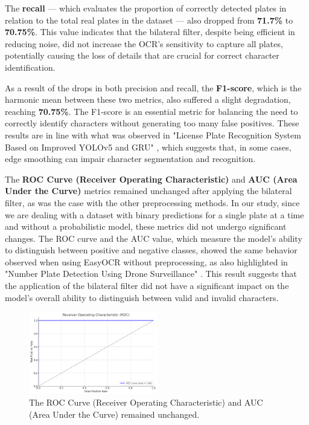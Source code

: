 \documentclass[conference]{IEEEtran}
\begin{document}
	The \textbf{recall} — which evaluates the proportion of correctly detected plates in relation to the total real plates in the dataset — also dropped from \textbf{71.7\%} to \textbf{70.75\%}. This value indicates that the bilateral filter, despite being efficient in reducing noise, did not increase the OCR's sensitivity to capture all plates, potentially causing the loss of details that are crucial for correct character identification.
	
	As a result of the drops in both precision and recall, the \textbf{F1-score}, which is the harmonic mean between these two metrics, also suffered a slight degradation, reaching \textbf{70.75\%}. The F1-score is an essential metric for balancing the need to correctly identify characters without generating too many false positives. These results are in line with what was observed in "License Plate Recognition System Based on Improved YOLOv5 and GRU" \cite{b8}, which suggests that, in some cases, edge smoothing can impair character segmentation and recognition.
	
	The \textbf{ROC Curve (Receiver Operating Characteristic)} and \textbf{AUC (Area Under the Curve)} metrics remained unchanged after applying the bilateral filter, as was the case with the other preprocessing methods. In our study, since we are dealing with a dataset with binary predictions for a single plate at a time and without a probabilistic model, these metrics did not undergo significant changes. The ROC curve and the AUC value, which measure the model's ability to distinguish between positive and negative classes, showed the same behavior observed when using EasyOCR without preprocessing, as also highlighted in "Number Plate Detection Using Drone Surveillance" \cite{b15}. This result suggests that the application of the bilateral filter did not have a significant impact on the model's overall ability to distinguish between valid and invalid characters.
	
	\begin{figure}[htbp]
		\centerline{\includegraphics[width=0.5\textwidth]{img13.png}}
		\caption{The ROC Curve (Receiver Operating Characteristic) and AUC (Area Under the Curve) remained unchanged.}
		\label{img13}
	\end{figure}
	
\end{document}

